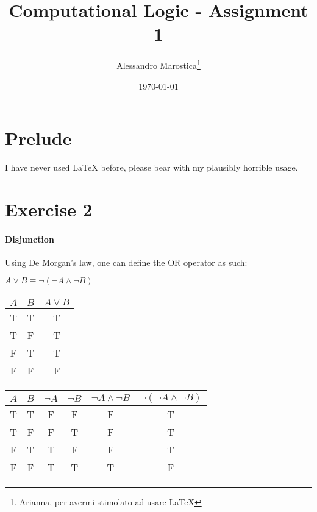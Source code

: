 \documentclass[11pt]{article}
\title{Computational Logic - Assignment 1}
\author{Alessandro Marostica\thanks{Arianna, per avermi stimolato ad usare LaTeX}}
\date{\today}
\begin{document}
\maketitle
\section*{Prelude}
I have never used LaTeX before, please bear with my plausibly horrible usage.
\section*{Exercise 2}
\paragraph*{Disjunction}
Using De Morgan's law, one can define the OR operator as such:
\begin{center}
    \(A \vee B \equiv \neg(\neg A \wedge \neg B)\)
\end{center}
\begin{center}
    \begin{tabular}{|c|c|c|}
        \hline
        \(A\) & \(B\) & \(A \vee B\) \\
        \hline
        T & T & T \\
        T & F & T \\
        F & T & T \\
        F & F & F \\
        \hline
    \end{tabular}
    \begin{tabular}{|c|c|c|c|c|c|}
        \hline
        \(A\) & \(B\) & \(\neg A\) & \(\neg B\) & \(\neg A \wedge \neg B\) & \(\neg(\neg A \wedge \neg B)\) \\
        \hline
        T & T & F & F & F & T \\
        T & F & F & T & F & T \\
        F & T & T & F & F & T \\
        F & F & T & T & T & F \\
        \hline       
    \end{tabular}
\end{center}
\end{document}
